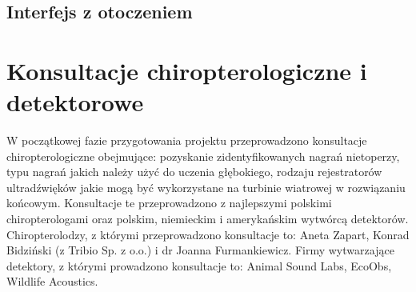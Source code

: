 \documentclass{sprz}
\begin{document}
  \clearpage

\subsection*{Interfejs z otoczeniem}
  
  \begin{requirementstab}[label={tab:requirements:func1},caption={System wyłączający wiatraki}]
    \implementation{}
    \reqrelated{}
  \end{requirementstab}

  \begin{requirementstab}[label={tab:requirements:func1},caption={Baza danych}]
    \implementation{}
    \reqrelated{}
  \end{requirementstab}

  \clearpage

\section{Konsultacje chiropterologiczne i detektorowe}
W początkowej fazie przygotowania projektu przeprowadzono konsultacje chiropterologiczne obejmujące: pozyskanie zidentyfikowanych nagrań nietoperzy, typu nagrań jakich należy użyć do uczenia głębokiego, rodzaju rejestratorów ultradźwięków jakie mogą być wykorzystane na turbinie wiatrowej w rozwiązaniu końcowym. Konsultacje te przeprowadzono z najlepszymi polskimi chiropterologami oraz polskim, niemieckim i amerykańskim wytwórcą detektorów. Chiropterolodzy, z którymi przeprowadzono konsultacje to: Aneta Zapart, Konrad Bidziński (z Tribio Sp. z o.o.) i dr Joanna Furmankiewicz. Firmy wytwarzające detektory, z którymi prowadzono konsultacje to: Animal Sound Labs, EcoObs, Wildlife Acoustics.
\end{document}
